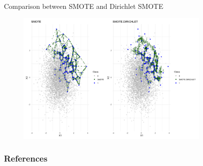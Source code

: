 \documentclass{beamer}
\begin{document}
\begin{frame}{Comparison between SMOTE and Dirichlet SMOTE}
\begin{figure}
  \centering
  \includegraphics[width=1.03\linewidth, height = 6.5cm]{figures/combined.png}
  \label{fig:label3}
\end{figure}   
\end{frame}












\begin{frame}
  \frametitle{References}
  \nocite{*}
  \printbibliography
\end{frame}
\end{document}
